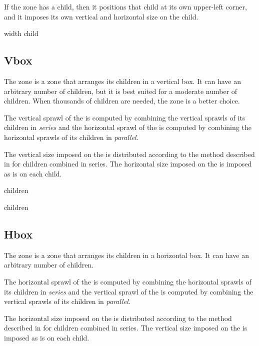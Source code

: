 If the  zone has a child, then it positions that child at
its own upper-left corner, and it imposes its own vertical and
horizontal size on the child.


 {width \optional child}

\subsection{Vbox}
\label{sec-zones-layout-vbox}

The  zone is a zone that arranges its children in a
vertical box.  It can have an arbitrary number of children, but it is
best suited for a moderate number of children.  When thousands of
children are needed, the  zone is a better
choice. 

The vertical sprawl of the  is computed by combining the
vertical sprawls of its children in \emph{series} and the horizontal
sprawl of the  is computed by combining the horizontal
sprawls of its children in \emph{parallel}.

The vertical size imposed on the  is distributed according
to the method described in 
for children combined in series.  The horizontal size imposed on the
 is imposed as is on each child. 


 {children}

 {\rest children}

\subsection{Hbox}
\label{sec-zones-layout-hbox}

The  zone is a zone that arranges its children in a
horizontal box.  It can have an arbitrary number of children.

The horizontal sprawl of the  is computed by combining the
horizontal sprawls of its children in \emph{series} and the vertical
sprawl of the  is computed by combining the vertical
sprawls of its children in \emph{parallel}.

The horizontal size imposed on the  is distributed according
to the method described in 
for children combined in series.  The vertical size imposed on the
 is imposed as is on each child. 

